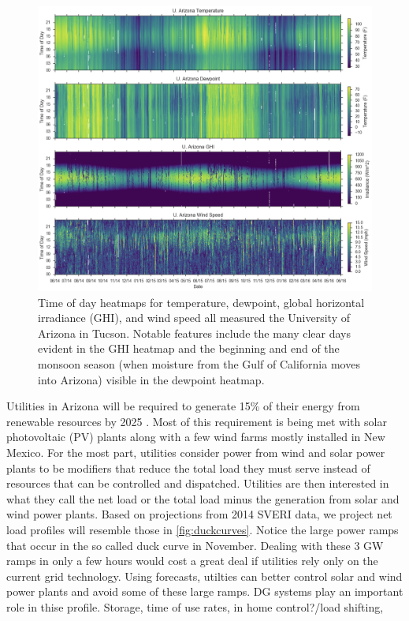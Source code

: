 \begin{figure}[p]
\centering
\includegraphics[width=\textwidth]{figs/ua_heat.png}
\caption[Heatmaps of temperature, dewpoint, irradiance, and wind
speed]{Time of day heatmaps for temperature, dewpoint, global
  horizontal irradiance (GHI), and wind speed all measured the
  University of Arizona in Tucson. Notable features include the many
  clear days evident in the GHI heatmap and the beginning and end of the
  monsoon season (when moisture from the Gulf of California moves into
  Arizona) visible in the dewpoint heatmap.}
\label{fig:ua_heatmap}
\end{figure}


Utilities in Arizona will be required to generate 15\% of their
energy from renewable resources by 2025 \citep{rest}.
Most of this requirement is being met with solar photovoltaic (PV)
plants along with a few wind farms mostly installed in New Mexico.
For the most part, utilities consider power from wind and solar power
plants to be modifiers that reduce the total load they must serve
instead of resources that can be controlled and dispatched.
Utilities are then interested in what they call the net load or the
total load minus the generation from solar and wind power plants.
Based on projections from 2014 SVERI data, we project net load
profiles will resemble those in \cref{fig:duckcurves}.
Notice the large power ramps that occur in the so called duck curve in
November.
Dealing with these 3 GW ramps in only a few hours would cost a great
deal if utilities rely only on the current grid technology.
Using forecasts, utilties can better control solar and wind power
plants and avoid some of these large ramps.
DG systems play an important role in thise profile.
Storage, time of use rates, in home control?/load shifting,

